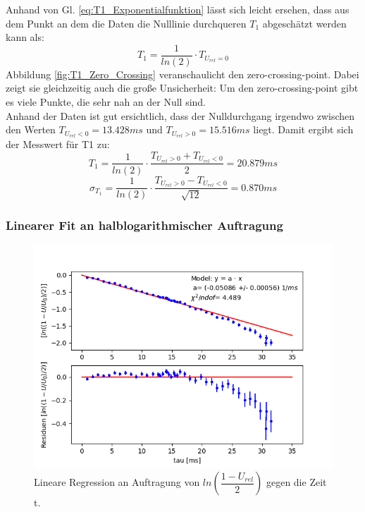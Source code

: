 \documentclass[12pt,a4paper]{article}
\begin{document}
Anhand von Gl. \ref{eq:T1_Exponentialfunktion} lässt sich leicht ersehen, dass aus dem Punkt an dem die Daten die Nulllinie durchqueren $T_1$ abgeschätzt werden kann als:
\begin{equation*}
T_1 = \dfrac{1}{ln(2)} \cdot T_{U_{rel} = 0}
\end{equation*}
Abbildung \ref{fig:T1_Zero_Crossing} veranschaulicht den zero-crossing-point. Dabei zeigt sie gleichzeitig auch die große Unsicherheit: Um den zero-crossing-point gibt es viele Punkte, die sehr nah an der Null sind. \\ 
Anhand der Daten ist gut ersichtlich, dass der Nulldurchgang irgendwo zwischen den Werten $T_{U_{rel} < 0} = 13.428ms$ und $T_{U_{rel} > 0} = 15.516ms$ liegt. Damit ergibt sich der Messwert für T1 zu:
\begin{equation*}
T_1 = \dfrac{1}{ln(2)} \cdot \dfrac{T_{U_{rel} > 0} + T_{U_{rel} < 0}}{2} = 20.879 ms
\end{equation*}
\begin{equation*}
\sigma _{T_1} = \dfrac{1}{ln(2)} \cdot \dfrac{T_{U_{rel} > 0} - T_{U_{rel} < 0}}{\sqrt{12}} = 0.870 ms
\end{equation*}

\subsubsection{Linearer Fit an halblogarithmischer Auftragung}

\begin{figure}
\centering
\includegraphics[scale=0.7]{Bilder/T1_linFit_halblog.PNG}
\caption{Lineare Regression an Auftragung von $ln\left(\dfrac{1-U_{rel}}{2}\right)$ gegen die Zeit t.}
\label{fig:T1_linFit}
\end{figure}
\end{document}
